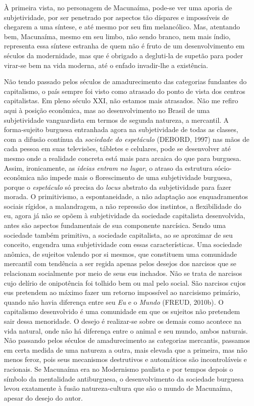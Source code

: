 À primeira vista, no personagem de Macunaíma, pode-se ver uma aporia de
subjetividade, por ser penetrado por aspectos tão díspares e impossíveis
de chegarem a uma síntese, e até mesmo por seu fim melancólico. Mas,
atentando bem, Macunaíma, mesmo em seu limbo, não sendo branco, nem mais
índio, representa essa síntese estranha de quem não é fruto de um
desenvolvimento em séculos da modernidade, mas que é obrigado a
degluti-la de supetão para poder virar-se bem na vida moderna, até o
enfado invadir-lhe a existência.

Não tendo passado pelos séculos de amadurecimento das categorias
fundantes do capitalismo, o país sempre foi visto como atrasado do ponto
de vista dos centros capitalistas. Em pleno século XXI, não estamos mais
atrasados. Não me refiro aqui à posição econômica, mas ao
desenvolvimento no Brasil de uma subjetividade vanguardista em termos de
segunda natureza, a mercantil. A forma-sujeito burguesa entranhada agora
na subjetividade de todas as classes, com a difusão contínua da
\emph{sociedade do espetáculo} (DEBORD, 1997) nas mãos de cada pessoa em
suas televisões, tábletes e celulares, pode se desenvolver até mesmo
onde a realidade concreta está mais para arcaica do que para burguesa.
Assim, ironicamente, as \emph{ideias entram no lugar}, o atraso da
estrutura sócio-econômica não impede mais o florescimento de uma
subjetividade burguesa, porque o \emph{espetáculo} só precisa do
\emph{locus} abstrato da subjetividade para fazer morada. O
primitivismo, a espontaneidade, a não adaptação aos enquadramentos
sociais rígidos, a malandragem, a não repressão dos instintos, a
flexibilidade do eu, agora já não se opõem à subjetividade da sociedade
capitalista desenvolvida, antes são aspectos fundamentais de sua
componente narcísica. Sendo uma sociedade também primitiva, a sociedade
capitalista, ao se aproximar de seu conceito, engendra uma subjetividade
com essas características. Uma sociedade anômica, de sujeitos valendo
por si mesmos, que constituem uma comunidade mercantil com tendência a
ser regida apenas pelos desejos dos narcisos que se relacionam
socialmente por meio de seus eus inchados. Não se trata de narcisos cujo
delírio de onipotência foi tolhido bem ou mal pelo social. São narcisos
cujos eus pretendem ao máximo fazer um retorno impossível ao narcisismo
primário, quando não havia diferença entre seu \emph{Eu} e o
\emph{Mundo} (FREUD, 2010b)\emph{.} O capitalismo desenvolvido é uma
comunidade em que os sujeitos não pretendem sair dessa menoridade. O
desejo é realizar-se sobre os demais como acontece na vida natural, onde
não há diferença entre o animal e seu mundo, ambos naturais. Não
passando pelos séculos de amadurecimento as categorias mercantis,
passamos em certa medida de uma natureza a outra, mais elevada que a
primeira, mas não menos feroz, pois seus mecanismos destrutivos e
automáticos são incontroláveis e racionais. Se Macunaíma era no
Modernismo paulista e por tempos depois o símbolo da mentalidade
antiburguesa, o desenvolvimento da sociedade burguesa levou exatamente à
fusão natureza-cultura que são o mundo de Macunaíma, apesar do desejo do
autor.

